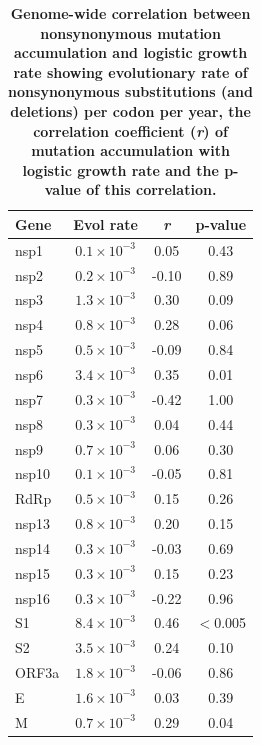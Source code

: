 \documentclass[11pt,oneside,letterpaper]{article}
\begin{document}
\begin{table}[]
    \begin{center}
    \caption{\textbf{Genome-wide correlation between nonsynonymous mutation accumulation and logistic growth rate showing evolutionary rate of nonsynonymous substitutions (and deletions) per codon per year, the correlation coefficient (\emph{r}) of mutation accumulation with logistic growth rate and the p-value of this correlation.}}
    \begin{tabular}{lccc}
    \hline
    \textbf{Gene} & \textbf{Evol rate} & \textbf{\emph{r}} & \textbf{p-value} \\
    \hline
    nsp1  & $0.1 \times 10^{-3}$  & 0.05   & 0.43     \\
    nsp2  & $0.2 \times 10^{-3}$  & -0.10  & 0.89     \\
    nsp3  & $1.3 \times 10^{-3}$  & 0.30   & 0.09     \\
    nsp4  & $0.8 \times 10^{-3}$  & 0.28   & 0.06     \\
    nsp5  & $0.5 \times 10^{-3}$  & -0.09  & 0.84     \\
    nsp6  & $3.4 \times 10^{-3}$  & 0.35   & 0.01     \\
    nsp7  & $0.3 \times 10^{-3}$  & -0.42  & 1.00     \\
    nsp8  & $0.3 \times 10^{-3}$  & 0.04   & 0.44     \\
    nsp9  & $0.7 \times 10^{-3}$  & 0.06   & 0.30     \\
    nsp10 & $0.1 \times 10^{-3}$  & -0.05  & 0.81     \\
    RdRp  & $0.5 \times 10^{-3}$  & 0.15   & 0.26     \\
    nsp13 & $0.8 \times 10^{-3}$  & 0.20   & 0.15     \\
    nsp14 & $0.3 \times 10^{-3}$  & -0.03  & 0.69     \\
    nsp15 & $0.3 \times 10^{-3}$  & 0.15   & 0.23     \\
    nsp16 & $0.3 \times 10^{-3}$  & -0.22  & 0.96     \\
    S1    & $8.4 \times 10^{-3}$  & 0.46   & $<$0.005 \\
    S2    & $3.5 \times 10^{-3}$  & 0.24   & 0.10     \\
    ORF3a & $1.8 \times 10^{-3}$  & -0.06  & 0.86     \\
    E     & $1.6 \times 10^{-3}$  & 0.03   & 0.39     \\
    M     & $0.7 \times 10^{-3}$  & 0.29   & 0.04     \\

\end{tabular}
\end{center}
\end{table}
\end{document}
